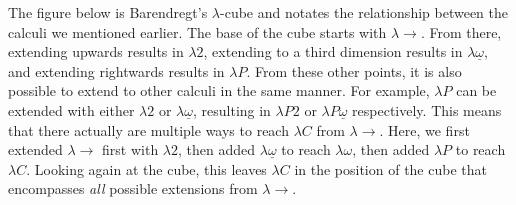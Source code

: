 \documentclass[9pt,preprint,nocopyrightspace,computermodern]{sigplanconf} %
\begin{document}
The figure below is Barendregt's \(\lambda\)-cube \cite{bar2} and notates the
relationship between the calculi we mentioned earlier. The base of the cube
starts with \(\lambda\!\!\rightarrow\). From there, extending upwards results in
\(\lambda 2\), extending to a third dimension results in \(\lambda\underline\omega\),
and extending rightwards results in \(\lambda P\). From these other points, it is
also possible to extend to other calculi in the same manner. For example, \(\lambda P\)
can be extended with either \(\lambda2\) or \(\lambda\underline\omega\),
resulting in \(\lambda P2\) or \(\lambda P\underline\omega\) respectively.
This means that there actually are multiple ways to reach \(\lambda C\) from
\(\lambda\!\!\rightarrow\). Here, we first extended \(\lambda\!\!\rightarrow\)
first with \(\lambda2\), then added \(\lambda\underline\omega\) to reach
\(\lambda\omega\), then added \(\lambda P\) to reach \(\lambda C\). Looking again
at the cube, this leaves \(\lambda C\) in the position of the cube that
encompasses \textit{all} possible extensions from \(\lambda\!\!\rightarrow\).
\begin{center}
\end{center}
\end{document}
